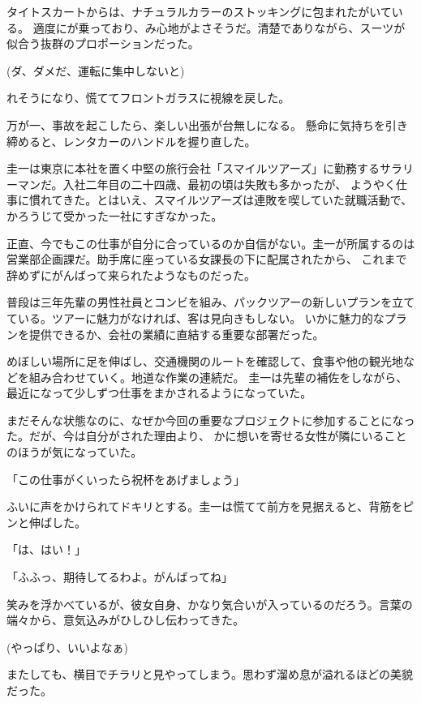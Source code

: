 ﻿\documentclass[
    book,tate,
    line_length=30zw,
    jafontsize=12pt,
    paper=b5j,
    landscape,
    ]{jlreq}
\begin{document}
タイトスカートからは、ナチュラルカラーのストッキングに包まれたがいている。
適度にが乗っており、み心地がよさそうだ。清楚でありながら、スーツが似合う抜群のプロポーションだった。

(ダ、ダメだ、運転に集中しないと)

れそうになり、慌ててフロントガラスに視線を戻した。

万が一、事故を起こしたら、楽しい出張が台無しになる。 懸命に気持ちを引き締めると、レンタカーのハンドルを握り直した。

圭一は東京に本社を置く中堅の旅行会社「スマイルツアーズ」に勤務するサラリーマンだ。入社二年目の二十四歳、最初の頃は失敗も多かったが、
ようやく仕事に慣れてきた。とはいえ、スマイルツアーズは連敗を喫していた就職活動で、かろうじて受かった一社にすぎなかった。

正直、今でもこの仕事が自分に合っているのか自信がない。圭一が所属するのは営業部企画課だ。助手席に座っている女課長の下に配属されたから、
これまで辞めずにがんばって来られたようなものだった。

普段は三年先輩の男性社員とコンビを組み、パックツアーの新しいプランを立てている。ツアーに魅力がなければ、客は見向きもしない。
いかに魅力的なプランを提供できるか、会社の業績に直結する重要な部署だった。

めぼしい場所に足を伸ばし、交通機関のルートを確認して、食事や他の観光地などを組み合わせていく。地道な作業の連続だ。
圭一は先輩の補佐をしながら、最近になって少しずつ仕事をまかされるようになっていた。

まだそんな状態なのに、なぜか今回の重要なプロジェクトに参加することになった。だが、今は自分がされた理由より、
かに想いを寄せる女性が隣にいることのほうが気になっていた。

「この仕事がくいったら祝杯をあげましょう」

ふいに声をかけられてドキリとする。圭一は慌てて前方を見据えると、背筋をピンと伸ばした。

「は、はい！」

「ふふっ、期待してるわよ。がんばってね」

笑みを浮かべているが、彼女自身、かなり気合いが入っているのだろう。言葉の端々から、意気込みがひしひし伝わってきた。

(やっぱり、いいよなぁ)

またしても、横目でチラリと見やってしまう。思わず溜め息が溢れるほどの美貌だった。
\end{document}
